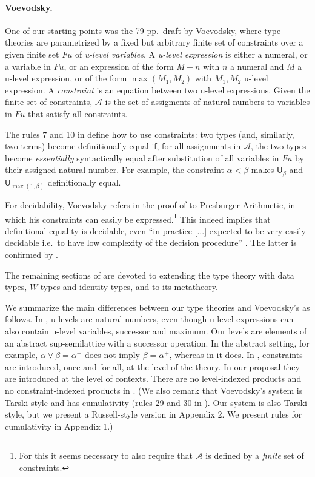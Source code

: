\documentclass[11pt,a4paper]{article}
\theoremstyle{definition}
\newcommand{\UU}{\mathsf{U}}
\newcommand{\AFu}{\mathcal{A}}
\newcommand{\Fu}{\mathit{Fu}}
\begin{document}
\paragraph{Voevodsky.} One of our starting points was the 79 pp.\ draft \cite{VV} by Voevodsky, where type theories are parametrized by a fixed but arbitrary finite set of constraints over a given finite
set $\Fu$ of \emph{u-level variables}. A \emph{u-level expression} \cite[Def. 2.0.2]{VV} is either a numeral,
or a variable in $\Fu$, or an expression of the form $M+n$ with $n$
a numeral and $M$ a u-level expression, or of the form $\max(M_1,M_2)$
with $M_1,M_2$ u-level expression. A \emph{constraint} is an equation
between two u-level expressions. Given the finite set of constraints,
$\AFu$ is the set of assigments of natural numbers to variables
in $\Fu$ that satisfy all constraints.

The rules 7 and 10 in \cite[Section 3.4]{VV} define how to use constraints:
two types (and, similarly, two terms) become definitionally equal
if, for all assignments in $\AFu$, the two types become \emph{essentially}
syntactically equal after substitution of all variables in $\Fu$ by
their assigned natural number. For example, the constraint
$\alpha < \beta$ makes $\UU_\beta$ and $\UU_{\max(1,\beta)}$
definitionally equal.

For decidability, Voevodsky refers in the proof of
\cite[Lemma 2.0.4, proof]{VV} to Presburger Arithmetic,
in which his constraints can easily be expressed.\footnote{%
For this it seems necessary to also require that $\AFu$
is defined by a \emph{finite} set of constraints.}%
This indeed implies that definitional equality is decidable, even
``in practice [...] expected to be very easily decidable i.e.\
to have low complexity of the decision procedure''
\cite[p.\ 5, l.\ -13]{VV}.
The latter is confirmed by \cite{bezem-coquand:lattices}.

The remaining sections of \cite{VV} are devoted to extending the
type theory with data types, $W$-types and identity types,
and to its metatheory.

We summarize the main differences between our type theories
and Voevodsky's as follows.
%
In \cite{VV}, u-levels are natural numbers, even though u-level
expressions can also contain u-level variables, successor and maximum.
Our levels are elements of an abstract sup-semilattice with a successor
operation. In the abstract setting, for example,
$\alpha\vee\beta=\alpha^+$ does not imply $\beta=\alpha^+$,
whereas in \cite{VV} it does.
%
In \cite{VV}, constraints are introduced, once and for all,
at the level of the theory. In our proposal they are introduced
at the level of contexts.
There are no level-indexed products and no constraint-indexed products in \cite{VV}.
%
%
(We also remark that Voevodsky's system is Tarski-style and has cumulativity (rules 29 and 30 in \cite[Section 3.4]{VV}). Our system is also Tarski-style, but we present a Russell-style version in Appendix 2. We present rules for cumulativity in Appendix 1.)
\end{document}
